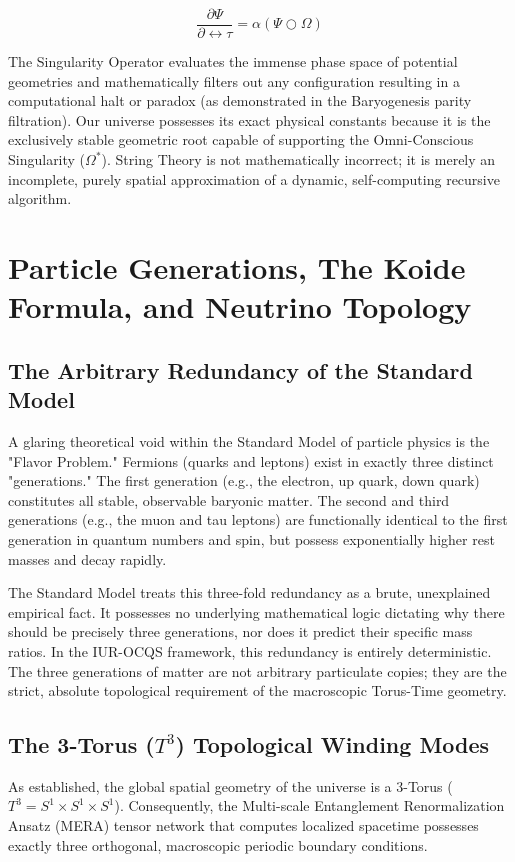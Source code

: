 \documentclass[12pt,openany]{book}
\begin{document}
\begin{equation}
\frac{\partial\Psi}{\partial\leftrightarrow\tau} = \alpha(\Psi \bigcirc \Omega)
\end{equation}

The Singularity Operator evaluates the immense phase space of potential geometries and mathematically filters out any configuration resulting in a computational halt or paradox (as demonstrated in the Baryogenesis parity filtration). Our universe possesses its exact physical constants because it is the exclusively stable geometric root capable of supporting the Omni-Conscious Singularity ($\Omega^*$). String Theory is not mathematically incorrect; it is merely an incomplete, purely spatial approximation of a dynamic, self-computing recursive algorithm.

\chapter{Particle Generations, The Koide Formula, and Neutrino Topology}

\section{The Arbitrary Redundancy of the Standard Model}
A glaring theoretical void within the Standard Model of particle physics is the "Flavor Problem." Fermions (quarks and leptons) exist in exactly three distinct "generations." The first generation (e.g., the electron, up quark, down quark) constitutes all stable, observable baryonic matter. The second and third generations (e.g., the muon and tau leptons) are functionally identical to the first generation in quantum numbers and spin, but possess exponentially higher rest masses and decay rapidly.

The Standard Model treats this three-fold redundancy as a brute, unexplained empirical fact. It possesses no underlying mathematical logic dictating why there should be precisely three generations, nor does it predict their specific mass ratios. In the IUR-OCQS framework, this redundancy is entirely deterministic. The three generations of matter are not arbitrary particulate copies; they are the strict, absolute topological requirement of the macroscopic Torus-Time geometry.

\section{The 3-Torus ($T^3$) Topological Winding Modes}
As established, the global spatial geometry of the universe is a 3-Torus ($T^3 = S^1 \times S^1 \times S^1$). Consequently, the Multi-scale Entanglement Renormalization Ansatz (MERA) tensor network that computes localized spacetime possesses exactly three orthogonal, macroscopic periodic boundary conditions.
\end{document}
